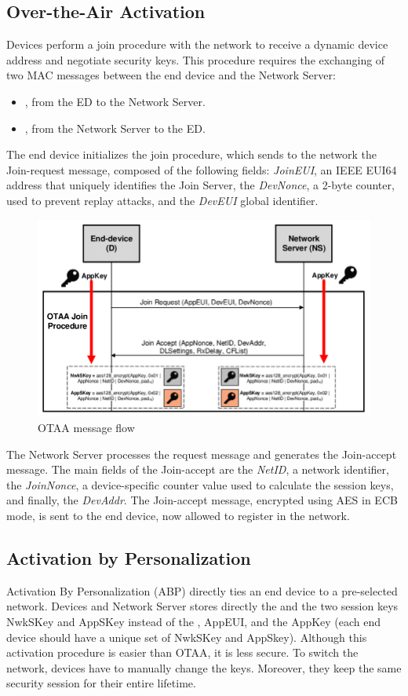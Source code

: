 \subsection{Over-the-Air Activation}
Devices perform a join procedure with the network to receive a dynamic device address and negotiate security keys. This procedure requires the exchanging of two MAC messages between the end device and the Network Server:
\begin{itemize}
	\item \textit{\jr}, from the ED to the Network Server.
	\item \textit{\ja}, from the Network Server to the ED.
\end{itemize}
The end device initializes the join procedure, which sends to the network the Join-request message, composed of the following fields: \textit{JoinEUI}, an IEEE EUI64 address that uniquely identifies the Join Server, the \textit{DevNonce}, a 2-byte counter, used to prevent replay attacks, and the \textit{DevEUI} global identifier. 
\begin{figure}
    \centering
    \includegraphics[width=0.9\linewidth]{images/lorawan/OTAA.png}
    \caption{OTAA message flow}
    \label{fig:otaa}
\end{figure}
The Network Server processes the request message and generates the Join-accept message. The main fields of the Join-accept are the \textit{NetID}, a network identifier, the \textit{JoinNonce}, a device-specific counter value used to calculate the session keys, and finally, the \textit{DevAddr}. The Join-accept message, encrypted using AES in ECB mode, is sent to the end device, now allowed to register in the network.

\subsection{Activation by Personalization}
Activation By Personalization (ABP) directly ties an end device to a pre-selected network. Devices and Network Server stores directly the \da and the two session keys NwkSKey and AppSKey instead of the \de, AppEUI, and the AppKey (each end device should have a unique set of NwkSKey and AppSkey). Although this activation procedure is easier than OTAA, it is less secure. To switch the network, devices have to manually change the keys. Moreover, they keep the same security session for their entire lifetime. 